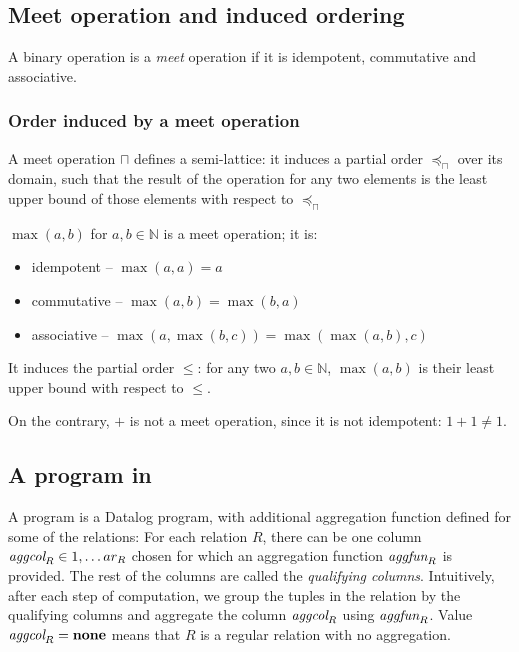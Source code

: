 \subsection{Meet operation and induced ordering}
\begin{defn}
A binary operation is a \emph{meet} operation if it is idempotent, commutative and associative.
\end{defn}

\subsubsection{Order induced by a meet operation}

A meet operation $\sqcap$ defines a semi-lattice: it induces a partial order $\preceq_\sqcap$ over its domain, such that the result of the operation for any two elements is the least upper bound of those elements with respect to $\preceq_\sqcap$

\begin{exmp}
$\max(a, b)$ for $a, b \in \mathbb{N}$ is a meet operation; it is:
\begin{itemize}
\item idempotent -- $\max(a, a) = a$
\item commutative -- $\max(a, b) = \max(b, a)$
\item associative -- $\max(a, \max(b, c)) = \max(\max(a, b), c)$
\end{itemize}
It induces the partial order $\le$: for any two $a, b \in \mathbb{N}$, $\max(a, b)$ is their least upper bound with respect to $\le$.


On the contrary, $+$ is not a meet operation, since it is not idempotent: $1+1 \ne 1$.
\end{exmp}

\subsection{A program in \datalogra}
A \datalogra program is a Datalog program, with additional aggregation function defined for some of the relations:
For each relation $R$, there can be one column $\textit{aggcol}_R \in {1, \dots ar_R}$ chosen for which an aggregation function $\textit{aggfun}_R$ is provided. The rest of the columns are called the \emph{qualifying columns}. Intuitively, after each step of computation, we group the tuples in the relation by the qualifying columns and aggregate the column $\textit{aggcol}_R$ using $\textit{aggfun}_R$. Value $\textit{aggcol}_R = \bf{none}$ means that $R$ is a regular relation with no aggregation.

